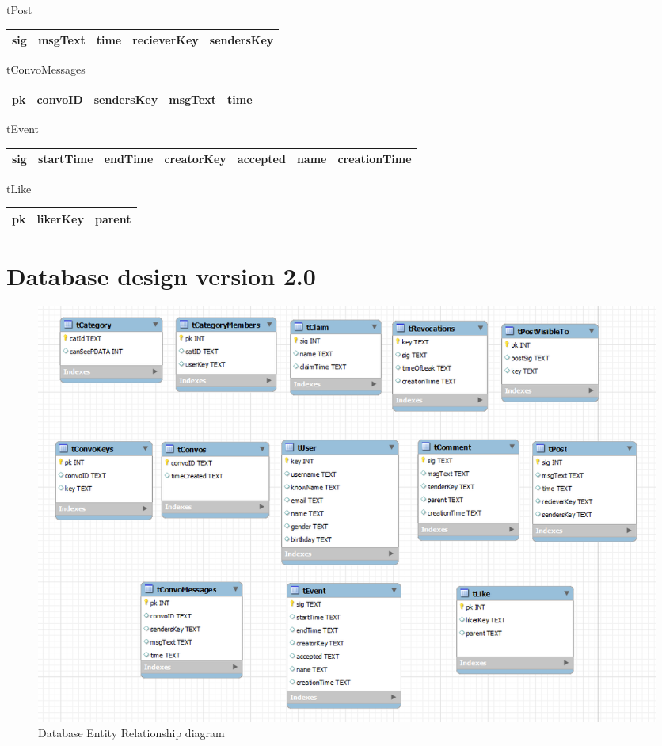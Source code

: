 tPost
\begin{center}
    \begin{tabular}{ | l | l | l | l | l |}
    \hline
    sig & msgText & time & recieverKey & sendersKey  \\ \hline
    \end{tabular}
\end{center}

tConvoMessages
\begin{center}
    \begin{tabular}{ | l | l | l | l | l |}
    \hline
    pk & convoID & sendersKey & msgText & time\\ \hline
    \end{tabular}
\end{center}

tEvent
\begin{center}
    \begin{tabular}{ | l | l | l | l | l | l | l |}
    \hline
    sig & startTime & endTime & creatorKey & accepted & name & creationTime \\ \hline
    \end{tabular}
\end{center}

tLike
\begin{center}
    \begin{tabular}{ | l | l | l |}
    \hline
    pk & likerKey & parent \\ \hline
    \end{tabular}
\end{center}

\section{Database design version 2.0}
\begin{landscape}
\begin{figure}[h]
    \includegraphics[width=1.4\textwidth]{images/design/db_shot.png}
    \caption{Database Entity Relationship diagram}
    \label{fig:db_er_diag}
\end{figure}
\end{landscape}


